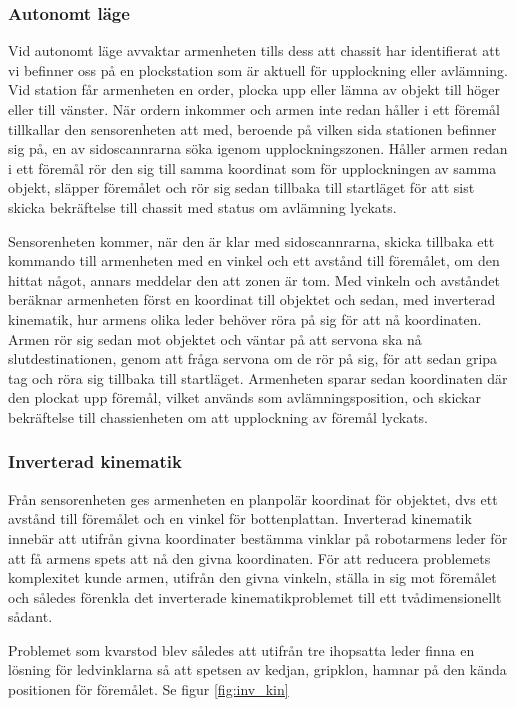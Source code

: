 \subsubsection{Autonomt läge}

Vid autonomt läge avvaktar armenheten tills dess att chassit har identifierat att vi befinner oss på en plockstation som är aktuell för upplockning eller avlämning. Vid station får armenheten en order, plocka upp eller lämna av objekt till höger eller till vänster. När ordern inkommer och armen inte redan håller i ett föremål tillkallar den sensorenheten att med, beroende på vilken sida stationen befinner sig på, en av sidoscannrarna söka igenom upplockningszonen. Håller armen redan i ett föremål rör den sig till samma koordinat som för upplockningen av samma objekt, släpper föremålet och rör sig sedan tillbaka till startläget för att sist skicka bekräftelse till chassit med status om avlämning lyckats.

Sensorenheten kommer, när den är klar med sidoscannrarna, skicka tillbaka ett kommando till armenheten med en vinkel och ett avstånd till föremålet, om den hittat något, annars meddelar den att zonen är tom. Med vinkeln och avståndet beräknar armenheten först en koordinat till objektet och sedan, med inverterad kinematik, hur armens olika leder behöver röra på sig för att nå koordinaten. Armen rör sig sedan mot objektet och väntar på att servona ska nå slutdestinationen, genom att fråga servona om de rör på sig, för att sedan gripa tag och röra sig tillbaka till startläget. Armenheten sparar sedan koordinaten där den plockat upp föremål, vilket används som avlämningsposition, och skickar bekräftelse till chassienheten om att upplockning av föremål lyckats. 

\subsubsection{Inverterad kinematik}
\label{inverskinematik}

Från sensorenheten ges armenheten en planpolär koordinat för objektet, dvs ett avstånd till föremålet och en vinkel för bottenplattan. Inverterad kinematik innebär att utifrån givna koordinater bestämma vinklar på robotarmens leder för att få armens spets att nå den givna koordinaten. För att reducera problemets komplexitet kunde armen, utifrån den givna vinkeln, ställa in sig mot föremålet och således förenkla det inverterade kinematikproblemet till ett tvådimensionellt sådant.

Problemet som kvarstod blev således att utifrån tre ihopsatta leder finna en lösning för ledvinklarna så att spetsen av kedjan, gripklon, hamnar på den kända positionen för föremålet. Se figur \ref{fig:inv_kin}

